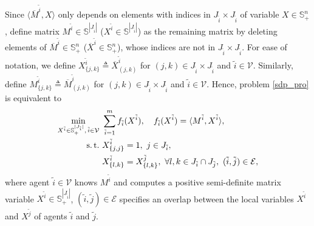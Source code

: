 \documentclass[journal]{IEEEtran}
\begin{document}
Since $\langle\overline{M}^{\tilde{i}},  X\rangle$ only depends on  elements with indices in $J_{\tilde{i}}\times J_{\tilde{i}}$ of variable $X\in\mathbb{S}_{+}^{n}$, define matrix $M^{\tilde{i}}\in \mathbb{S}^{|J_{\tilde{i}}|}$ ($X^{\tilde{i}}\in \mathbb{S}^{|J_{\tilde{i}}|}$) as the remaining matrix by deleting elements of $\overline{M}^{\tilde{i}}\in\mathbb{S}_{+}^{n}$ ($\overline{X}^{\tilde{i}}\in\mathbb{S}_{+}^{n}$), whose indices are not in $J_{\tilde{i}}\times J_{\tilde{i}}$. For ease of notation, we define $X^{\tilde{i}}_{\{j,k\}}\triangleq \overline{X}^{\tilde{i}}_{(j,k)}$ for $(j,k)\in J_{\tilde{i}}\times J_{\tilde{i}}$ and $\tilde{i}\in\mathcal V$. Similarly, define $M^{\tilde{i}}_{\{j,k\}}\triangleq \overline{M}^{\tilde{i}}_{(j,k)}$ for $(j,k)\in J_{\tilde{i}}\times J_{\tilde{i}}$ and $\tilde{i}\in\mathcal V$. Hence, problem \eqref{sdp_pro} is equivalent to
\begin{subequations}\label{sdp_pro2}
	\begin{align}
	\min_{X^{\tilde{i}}\in \mathbb{S}_+^{|J_{\tilde{i}}|},\,\tilde{i}\in\mathcal V} \,\, & \sum_{\tilde{i}=1}^m  f_{\tilde{i}}(X^{\tilde{i}}), \quad   f_{\tilde{i}}(X^{\tilde{i}})= \langle {M}^{\tilde{i}}, X^{\tilde{i}}\rangle, \label{sdp_func}\\
	{\rm s. \, t.}\, \, & X^{\tilde{i}}_{\{j,j\}}=1, \ j \in J_{\tilde{i}}, \label{sdp_constr}\\
	& X^{\tilde{i}}_{\{l,k\}}= X^{\tilde{j}}_{\{l,k\}}, \ \forall l,k \in J_{\tilde{i}}\cap J_{\tilde{j}},\ (\tilde{i},\tilde{j})\in \mathcal{E},
	\end{align}
\end{subequations}
where agent $\tilde{i}\in\mathcal V$ knows ${M}^{\tilde{i}}$ and computes a positive semi-definite matrix variable $X^{\tilde{i}}\in \mathbb{S}_{+}^{|J_{\tilde{i}}|}$, $(\tilde{i},\tilde{j})\in \mathcal{E}$ specifies an overlap between the local variables $X^{\tilde{i}}$ and $X^{\tilde{j}}$ of agents $\tilde{i}$ and $\tilde{j}$.




\end{document}
